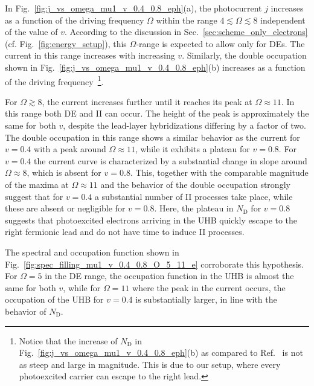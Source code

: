 \documentclass[aps,prb,groupedaddress,showpacs,twocolumn,superscriptaddress,10pt]{revtex4-2}
\begin{document}
In Fig.~\ref{fig:j_vs_omega_mu1_v_0.4_0.8_eph}(a), the photocurrent $j$ increases as a function of the driving frequency $\Omega$ within the range $4\lesssim\Omega\lesssim8$ independent of the value of $v$. According to the discussion in Sec.~\ref{sec:scheme_only_electrons} (cf.  Fig.~\ref{fig:energy_setup}), this $\Omega$-range is expected to allow only for DEs. The current in this range  increases with increasing $v$. Similarly, the double occupation shown in Fig.~\ref{fig:j_vs_omega_mu1_v_0.4_0.8_eph}(b) increases as a function of the driving frequency~\footnote{Notice that the increase of $N_{\text{D}}$ in Fig.~\ref{fig:j_vs_omega_mu1_v_0.4_0.8_eph}(b) as compared to Ref.~\cite{so.do.18} is not as steep and large in magnitude. This is due to our setup, where every photoexcited carrier can escape to the right lead.}.

For $\Omega\gtrsim8$, the current increases further until it reaches its peak at $\Omega\approx 11$.
In this range both DE and II can occur. The height of the peak is approximately the same for both $v$, despite the lead-layer hybridizations differing by a factor of two. The double occupation in this range shows a similar behavior as the current for $v=0.4$ with a peak around $\Omega\approx 11$, while it exhibits a plateau for $v=0.8$.
For $v=0.4$ the current curve is characterized by a substantial change in slope around $\Omega \approx 8$, which is absent for $v=0.8$.
 This, together with the comparable magnitude of the maxima at $\Omega\approx 11$ and the behavior of the double occupation strongly suggest that for $v=0.4$ a substantial number of II processes take place, while these are absent or negligible for $v=0.8$.
Here,  the plateau in $N_{\text{D}}$ for $v=0.8$ suggests that photoexcited electrons arriving in the UHB quickly escape to the right fermionic lead and do not have time to induce II processes.
 
The spectral and occupation function shown in Fig.~\ref{fig:spec_filling_mu1_v_0.4_0.8_O_5_11_e} corroborate this hypothesis. For $\Omega=5$ in the DE range, the occupation function in the UHB is almost the same for both $v$, while for $\Omega=11$ where the peak in the current occurs, the occupation of the UHB for $v=0.4$ is substantially larger,  in line with the behavior of $N_{\text{D}}$.
  
\end{document}
